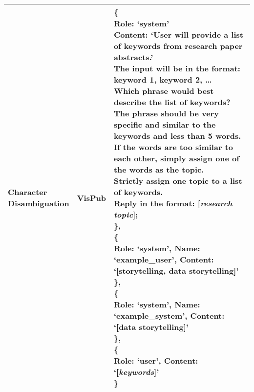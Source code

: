 \begin{center}
\begin{tabular}{ | p{3.0cm} | p{3.0cm} | p{13cm} | }
    \hline
    \makecell[tl]{Character\\ Disambiguation}  & VisPub & \makecell[tl]{\{\\
    \quad\textbf{Role:} `system'\\
    \quad\textbf{Content:} `User will provide a list of keywords from research paper abstracts.'\\ 
    \quad The input will be in the format: keyword 1, keyword 2, \dots \\
    \quad Which phrase would best describe the list of keywords? \\
    \quad The phrase should be very specific and similar to the keywords and less than 5 words. \\
    \quad If the words are too similar to each other, simply assign one of the words as the topic. \\
    \quad Strictly assign one topic to a list of keywords. \\
    \quad Reply in the format: [\textit{research topic}]; \\
    \},\\
    \{ \\
    \quad\textbf{Role:} `system', \textbf{Name:} `example\_user', \textbf{Content:} `[storytelling, data storytelling]' \\
    \}, \\
    \{ \\
    \quad\textbf{Role:} `system', \textbf{Name:} `example\_system', \textbf{Content:} `[data storytelling]' \\
    \}, \\
    \{ \\
    \quad\textbf{Role:} `user', \textbf{Content:} `[{\textit{keywords}}]' \\   
    \} \\
    } \\
    \hline

\end{tabular}
\end{center}


